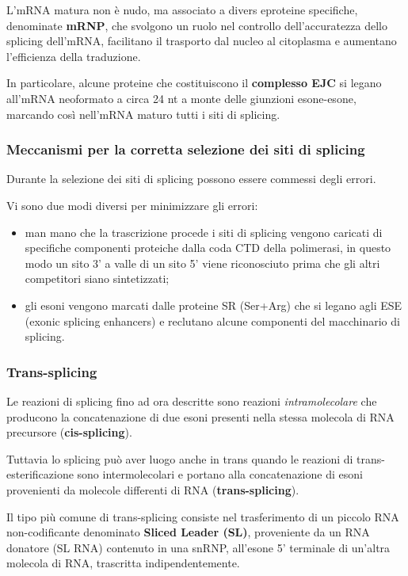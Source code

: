 \documentclass[]{article}
\begin{document}
L'mRNA matura non è nudo, ma associato a divers eproteine specifiche,
denominate \textbf{mRNP}, che svolgono un ruolo nel controllo
dell'accuratezza dello splicing dell'mRNA, facilitano il trasporto dal
nucleo al citoplasma e aumentano l'efficienza della traduzione.

In particolare, alcune proteine che costituiscono il \textbf{complesso
EJC} si legano all'mRNA neoformato a circa 24 nt a monte delle giunzioni
esone-esone, marcando così nell'mRNA maturo tutti i siti di splicing.

\subsubsection{Meccanismi per la corretta selezione dei siti di
splicing}\label{meccanismi-per-la-corretta-selezione-dei-siti-di-splicing}

Durante la selezione dei siti di splicing possono essere commessi degli
errori.

Vi sono due modi diversi per minimizzare gli errori:

\begin{itemize}
\itemsep1pt\parskip0pt
\item
  man mano che la trascrizione procede i siti di splicing vengono
  caricati di specifiche componenti proteiche dalla coda CTD della
  polimerasi, in questo modo un sito 3' a valle di un sito 5' viene
  riconosciuto prima che gli altri competitori siano sintetizzati;
\item
  gli esoni vengono marcati dalle proteine SR (Ser+Arg) che si legano
  agli ESE (exonic splicing enhancers) e reclutano alcune componenti del
  macchinario di splicing.
\end{itemize}

\subsubsection{Trans-splicing}\label{trans-splicing}

Le reazioni di splicing fino ad ora descritte sono reazioni
\emph{intramolecolare} che producono la concatenazione di due esoni
presenti nella stessa molecola di RNA precursore
(\textbf{cis-splicing}).

Tuttavia lo splicing può aver luogo anche in trans quando le reazioni di
trans-esterificazione sono intermolecolari e portano alla concatenazione
di esoni provenienti da molecole differenti di RNA
(\textbf{trans-splicing}).

Il tipo più comune di trans-splicing consiste nel trasferimento di un
piccolo RNA non-codificante denominato \textbf{Sliced Leader (SL)},
proveniente da un RNA donatore (SL RNA) contenuto in una snRNP,
all'esone 5' terminale di un'altra molecola di RNA, trascritta
indipendentemente.
\end{document}
